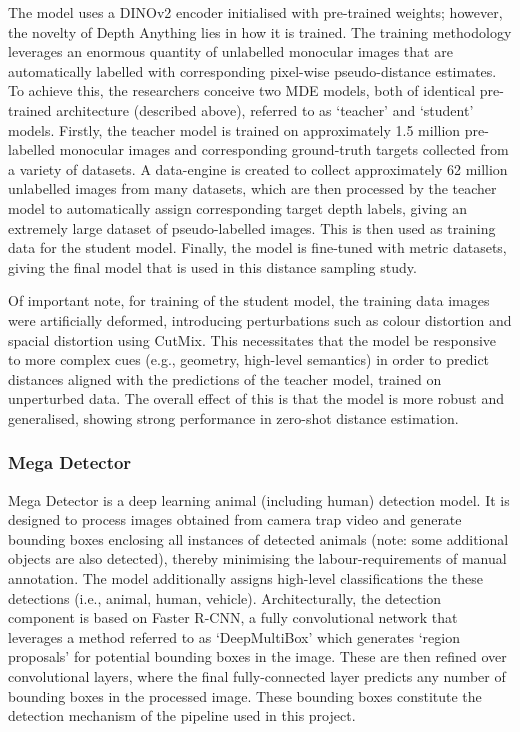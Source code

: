 The model uses a DINOv2 encoder initialised with pre-trained weights;\cite{dino_v2} however,
the novelty of Depth Anything lies in how it is trained.
The training methodology leverages an enormous quantity of unlabelled monocular images that are
automatically labelled with corresponding pixel-wise pseudo-distance estimates.
To achieve this, the researchers conceive two MDE models, both of identical pre-trained architecture
(described above), referred to as `teacher' and `student' models.
Firstly, the teacher model is trained on approximately 1.5 million pre-labelled monocular images
and corresponding ground-truth targets collected from a variety of datasets.
A data-engine is created to collect approximately 62 million unlabelled images from many datasets,
which are then processed by the teacher model to automatically assign corresponding target depth labels,
giving an extremely large dataset of pseudo-labelled images.
This is then used as training data for the student model.
Finally, the model is fine-tuned with metric datasets,\cite{nyu_v2,kitti} giving the final model that
is used in this distance sampling study.\cite{depth_anything}

Of important note, for training of the student model, the training data images were artificially
deformed, introducing perturbations\cite{depth_anything} such as colour distortion and spacial
distortion using CutMix.\cite{cutmix}
This necessitates that the model be responsive to more complex cues (e.g., geometry, high-level semantics)
in order to predict distances aligned with the predictions of the teacher model, trained on unperturbed
data.\cite{depth_anything}
The overall effect of this is that the model is more robust and generalised, showing strong performance in
zero-shot distance estimation.\cite{depth_anything,mde_models_comparison}

\subsubsection{Mega Detector}

Mega Detector is a deep learning animal (including human) detection model.
It is designed to process images obtained from camera trap video and generate bounding boxes
enclosing all instances of detected animals (note: some additional objects are also detected),
thereby minimising the labour-requirements of manual annotation.
The model additionally assigns high-level classifications the these detections (i.e., animal,
human, vehicle).\cite{mega_detector}
Architecturally, the detection component is based on Faster R-CNN,\cite{megadetector_article,faster_r}
a fully convolutional network that leverages a method referred to as `DeepMultiBox' which
generates `region proposals' for potential bounding boxes in the image.\cite{multibox}
These are then refined over convolutional layers, where the final fully-connected layer predicts
any number of bounding boxes in the processed image.\cite{faster_r}
These bounding boxes constitute the detection mechanism of the pipeline used in this project.

